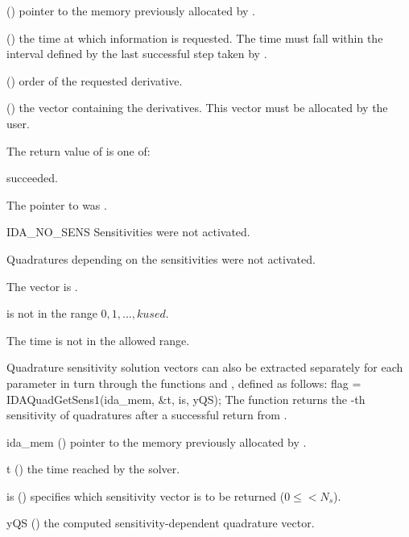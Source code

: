 {
  \begin{args}
  \item[\id{ida\_mem}] ()
    pointer to the memory previously allocated by .
  \item[\id{t}] ()
    the time at which information is requested. The time  must fall within the 
    interval defined by the last successful step taken by {\idas}.
  \item[\id{k}] () order of the requested derivative.
  \item[\id{dkyQS}] ()
    the vector containing the derivatives. This vector must be allocated by the user. 
  \end{args}
}
{
  The return value  of  is one of:
  \begin{args}
  \item[\Id{IDA\_SUCCESS}]
     succeeded.
  \item[\Id{IDA\_MEM\_NULL}]
    The pointer to  was .
  \item[IDA\_NO\_SENS]
    Sensitivities were not activated.
  \item[\Id{IDA\_NO\_QUADSENS}] 
    Quadratures depending on the sensitivities were not activated.
  \item[\Id{IDA\_BAD\_DKY}] 
    The vector  is .
  \item[\Id{IDA\_BAD\_K}]
     is not in the range $0, 1, ..., kused$.
  \item[\Id{IDA\_BAD\_T}] 
    The time  is not in the allowed range.
  \end{args}
}
{}
Quadrature sensitivity solution vectors can also be extracted separately for 
each parameter in turn through the functions  and
, defined as follows:
{
  flag = IDAQuadGetSens1(ida\_mem, \&t, is, yQS);
}
{
  The function  returns the -th sensitivity 
  of quadratures after a successful return from .
}
{
  \begin{args}
  \item[ida\_mem] ()
    pointer to the memory previously allocated by .
  \item[t] ()
    the time reached by the solver.
  \item[is] () specifies which sensitivity vector is to be returned
    ($0\le$$< N_s$).
  \item[yQS] ()
    the computed sensitivity-dependent quadrature vector.
  \end{args}
}
